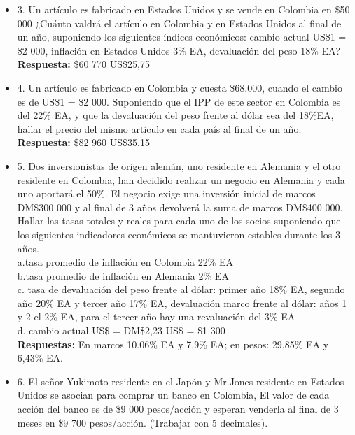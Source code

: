 \begin{itemize}
	\item 3. Un  artículo  es  fabricado  en  Estados  Unidos  y  se  vende  en  Colombia  en \$50 000  ¿Cuánto  valdrá  el  artículo  en  Colombia  y  en  Estados  Unidos  al final  de  un  año,  suponiendo  los  siguientes  índices  económicos: cambio actual US\$1 = \$2 000, inflación en Estados Unidos 3\% EA, devaluación del peso 18\% EA?\\
	\textbf{Respuesta:} \$60 770 \hspace{0,5cm} US\$25,75\\
	\medskip
	\item 4. Un  artículo  es  fabricado en  Colombia  y  cuesta  \$68.000,  cuando  el cambio es de US\$1 = \$2 000. Suponiendo que el IPP de este sector en Colombia es del 22\% EA, y que la devaluación del peso frente al dólar sea del 18\%EA, hallar el precio del mismo artículo en cada país al final de un año.\\
	\medskip
	\textbf{Respuesta:} \$82 960 \hspace{0,5cm} US\$35,15\\
	\medskip
	\item 5. Dos  inversionistas  de  origen  alemán,  uno  residente  en  Alemania  y el  otro residente  en  Colombia,  han  decidido  realizar  un  negocio  en  Alemania  y cada uno aportará el 50\%. El negocio exige una inversión inicial de marcos  DM\$300 000   y   al   final   de   3   años   devolverá   la   suma   de   marcos DM\$400 000. Hallar las tasas totales y reales para cada uno de los socios suponiendo  que  los  siguientes  indicadores  económicos  se  mantuvieron estables durante los 3 años.\\
	
	a.tasa promedio de inflación en Colombia 22\% EA\\
	b.tasa promedio de inflación en Alemania 2\% EA\\
	c.   tasa  de  devaluación  del  peso  frente  al  dólar:  primer  año  18\% EA, segundo  año  20\% EA  y  tercer  año  17\% EA,  devaluación  marco frente  al  dólar:  años  1  y  2  el  2\% EA,  para  el  tercer  año  hay  una revaluación del 3\% EA\\
	d. cambio actual US\$ = DM\$2,23               US\$ = \$1 300\\
	\medskip
	\textbf{Respuestas:} En marcos 10.06\% EA y 7.9\% EA; en pesos: 29,85\% EA y 6,43\% EA.\\
	\medskip
	
	\item 6. El señor Yukimoto residente en el Japón y Mr.Jones residente en Estados Unidos  se  asocian para comprar un banco en Colombia, El valor de cada acción del banco es de \$9 000 pesos/acción y esperan venderla al final de 3 meses en \$9 700 pesos/acción. (Trabajar con 5 decimales).\\
	

\end{itemize}
